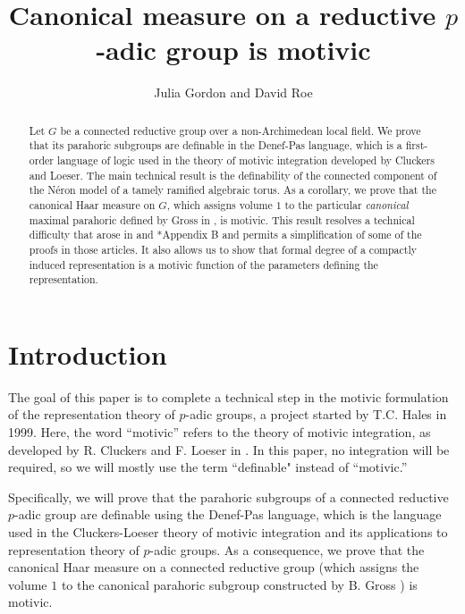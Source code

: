 \documentclass{amsart}
\title[]{Canonical measure on a reductive $p$-adic group is motivic}
\author{Julia Gordon and David Roe}
\theoremstyle{plain}
\theoremstyle{definition}
\begin{document}
\maketitle
\begin{abstract}  Let $G$ be a connected reductive group over a non-Archimedean local field. 
We prove that its parahoric subgroups are definable in the Denef-Pas language, which is a
first-order language of logic used in the theory of motivic integration developed by Cluckers and Loeser.
The main technical result is the definability of the connected component of the N\'eron model
of a tamely ramified algebraic torus.  As a corollary, we prove that the canonical Haar measure on $G$,
which assigns volume $1$ to the particular \emph{canonical} maximal parahoric defined by
Gross in \cite{gross:motive}, is motivic. This result resolves a technical difficulty that arose in
\cite{CGH-2} and \cite{S-T}*{Appendix B} and permits a simplification of some of the proofs in those articles. 
It also allows us to show that formal degree of a compactly induced representation is a
motivic function of the parameters defining the representation. 
\end{abstract}

\section{Introduction}
The goal of this paper is to complete a technical step in the 
motivic formulation of 
the representation theory of $p$-adic groups, a project started by T.C. Hales in 1999. 
Here, the word ``motivic'' refers to the theory of motivic integration, as developed by R. Cluckers and F. Loeser in \cite{cluckers-loeser}.  In this paper, no integration will be required, so we will mostly use the term ``definable" instead of ``motivic.'' 

Specifically, we will prove that the parahoric subgroups of a connected reductive $p$-adic group
are definable using the Denef-Pas language, which is the language used in the Cluckers-Loeser
theory of motivic integration and its applications to representation theory of $p$-adic groups.
As a consequence, we prove that the canonical Haar measure on a connected reductive group 
(which assigns the volume $1$ to the canonical parahoric subgroup constructed by B. Gross \cite{gross:motive}) is motivic.
\end{document}
